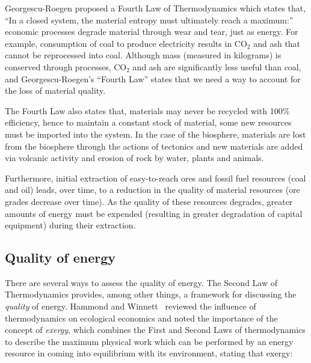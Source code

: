 Georgescu-Roegen proposed a 
Fourth Law of Thermodynamics
which states that, ``In a closed system, 
the material entropy must ultimately reach a maximum:'' 
economic processes degrade material through wear and tear,
just as energy.\cite{GeorgescuRoegen:1977tf}
For example, consumption of coal to produce electricity
results in CO$_2$ and ash that cannot
be reprocessed into coal.
Although mass (measured in kilograms) 
is conserved through processes, 
CO$_2$ and ash are significantly less useful than coal,
and Georgescu-Roegen's ``Fourth Law'' 
states that we need a way to account
for the loss of material quality.

The Fourth Law also states that,
materials may never be recycled with 100\%
efficiency, 
hence to maintain a constant stock of material,
some new resources must be imported into the system.
In the case of the biosphere,
materials are lost from the biosphere through
the actions of tectonics and new materials are added
via volcanic activity and erosion of rock by
water, plants and animals.

Furthermore, initial extraction of easy-to-reach ores 
and fossil fuel resources (coal and oil)
leads, over time, to a reduction in the quality 
of material resources 
(ore grades decrease over time).\cite{Mudd2010}
As the quality of these resources degrades,
greater amounts of energy must be expended
(resulting in greater degradation of capital equipment)
during their extraction.


\subsection{Quality of energy}
\label{sec:energy_quality}

There are several ways to assess the quality of energy.
The Second Law of Thermodynamics provides, 
among other things,
a framework for discussing the \emph{quality} of energy.
Hammond and Winnett~\cite{Hammond:2009tu} reviewed
the influence of thermodynamics on ecological economics 
and noted the importance of the concept of \emph{exergy},
which combines the First and Second Laws of thermodynamics
to describe the maximum physical work 
which can be performed by an energy resource
in coming into equilibrium with its environment,
stating that exergy:

